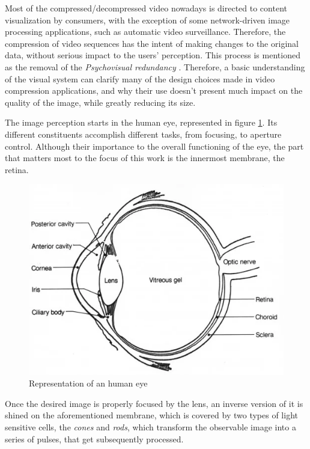 \nocite{gonzalezDigitalImageProcessing2018}

Most of the compressed/decompressed video nowadays is directed to content visualization by consumers, with the exception of some network-driven image processing applications, such as automatic video surveillance. Therefore, the compression of video sequences has the intent of making changes to the original data, without serious impact to the users' perception. This process is mentioned as the removal of the \emph{Psychovisual redundancy} \cite{shiImageVideoCompression2008}. Therefore, a basic understanding of the visual system can clarify many of the design choices made in video compression applications, and why their use doesn't present much impact on the quality of the image, while greatly reducing its size.

The image perception starts in the human eye, represented in figure \ref{fig:eye}. Its different constituents accomplish different tasks, from focusing, to aperture control. Although their importance to the overall functioning of the eye, the part that matters most to the focus of this work is the innermost membrane, the retina.

\begin{figure}[h]
    \centering
    \includegraphics[width=\figwidth]{Sections/3AV1/Diagrams/eyediagram.png}
    \caption[Representation of an human eye]{Representation of an human eye \cite{AnatomyEyeHuman}}
    \label{fig:eye}
\end{figure}

Once the desired image is properly focused by the lens, an inverse version of it is shined on the aforementioned membrane, which is covered by two types of light sensitive cells, the \emph{cones} and \emph{rods}, which transform the observable image into a series of pulses, that get subsequently processed.


